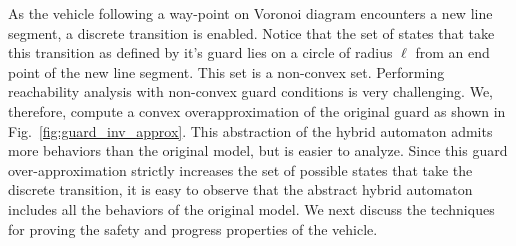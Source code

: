 %
As the vehicle following a way-point on Voronoi diagram encounters a new line segment, a discrete transition is enabled. Notice that the set of states that take this transition as defined by it's guard lies on a circle of radius $\ell$ from an end point of the new line segment.
%
This set is a non-convex set.
%
Performing reachability analysis with non-convex guard conditions is very challenging.
%
We, therefore, compute a convex overapproximation of the original guard as shown in Fig.~\ref{fig:guard_inv_approx}. This abstraction of the hybrid automaton admits more behaviors than the original model, but is easier to analyze.
%
%
Since this guard over-approximation strictly increases the set of possible states that take the discrete transition, it is easy to observe that the abstract hybrid automaton includes all the behaviors of the original model.
%
%
%
%
We next discuss the techniques for proving the safety and progress properties of the vehicle.






